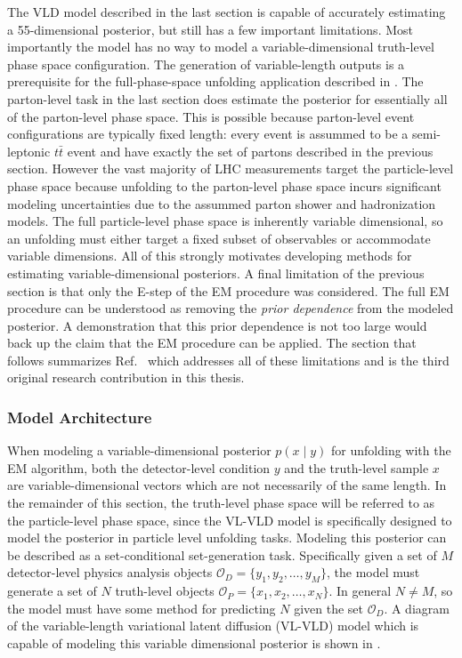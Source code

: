 The VLD model described in the last section is capable of accurately estimating a 55-dimensional posterior, but still has a few important limitations.
Most importantly the model has no way to model a variable-dimensional truth-level phase space configuration.
The generation of variable-length outputs is a prerequisite for the full-phase-space unfolding application described in .
The parton-level task in the last section does estimate the posterior for essentially all of the parton-level phase space.
This is possible because parton-level event configurations are typically fixed length: every event is assummed to be a semi-leptonic $t\bar{t}$ event and have exactly the set of partons described in the previous section.
However the vast majority of LHC measurements target the particle-level phase space because unfolding to the parton-level phase space incurs significant modeling uncertainties due to the assummed parton shower and hadronization models.
The full particle-level phase space is inherently variable dimensional, so an unfolding must either target a fixed subset of observables or accommodate variable dimensions.
All of this strongly motivates developing methods for estimating variable-dimensional posteriors.
A final limitation of the previous section is that only the E-step of the EM procedure was considered.
The full EM procedure can be understood as removing the \textit{prior dependence} from the modeled posterior.
A demonstration that this prior dependence is not too large would back up the claim that the EM procedure can be applied.
The section that follows summarizes Ref.~\cite{Shmakov:2024gkd} which addresses all of these limitations and is the third original research contribution in this thesis.

\subsubsection{Model Architecture}

When modeling a variable-dimensional posterior $p(x \mid y)$ for unfolding with the EM algorithm, both the detector-level condition $y$ and the truth-level sample $x$ are variable-dimensional vectors which are not necessarily of the same length.
In the remainder of this section, the truth-level phase space will be referred to as the particle-level phase space, since the VL-VLD model is specifically designed to model the posterior in particle level unfolding tasks.
Modeling this posterior can be described as a set-conditional set-generation task.
Specifically given a set of $M$ detector-level physics analysis objects $\mathcal{O}_D = \{y_1, y_2, \ldots, y_M\}$, the model must generate a set of $N$ truth-level objects $\mathcal{O}_P = \{x_1, x_2, \ldots, x_N\}$.
In general $N \neq M$, so the model must have some method for predicting $N$ given the set $\mathcal{O}_D$.
A diagram of the variable-length variational latent diffusion (VL-VLD) model which is capable of modeling this variable dimensional posterior is shown in .

